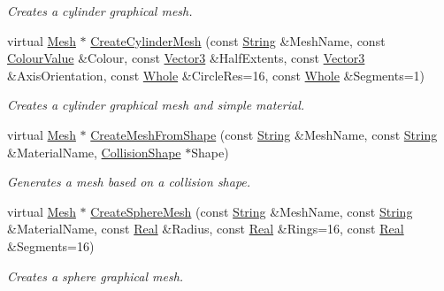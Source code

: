 \begin{DoxyCompactItemize}
\begin{DoxyCompactList}\small\item\em Creates a cylinder graphical mesh. \item\end{DoxyCompactList}\item 
virtual \hyperlink{classphys_1_1Mesh}{Mesh} $\ast$ \hyperlink{classphys_1_1MeshManager_a3e690963dc53e430dabe4ac9915ef170}{CreateCylinderMesh} (const \hyperlink{namespacephys_aa03900411993de7fbfec4789bc1d392e}{String} \&MeshName, const \hyperlink{classphys_1_1ColourValue}{ColourValue} \&Colour, const \hyperlink{classphys_1_1Vector3}{Vector3} \&HalfExtents, const \hyperlink{classphys_1_1Vector3}{Vector3} \&AxisOrientation, const \hyperlink{namespacephys_a460f6bc24c8dd347b05e0366ae34f34a}{Whole} \&CircleRes=16, const \hyperlink{namespacephys_a460f6bc24c8dd347b05e0366ae34f34a}{Whole} \&Segments=1)
\begin{DoxyCompactList}\small\item\em Creates a cylinder graphical mesh and simple material. \item\end{DoxyCompactList}\item 
virtual \hyperlink{classphys_1_1Mesh}{Mesh} $\ast$ \hyperlink{classphys_1_1MeshManager_a103d2b3cbead1341c3a45f138a68db45}{CreateMeshFromShape} (const \hyperlink{namespacephys_aa03900411993de7fbfec4789bc1d392e}{String} \&MeshName, const \hyperlink{namespacephys_aa03900411993de7fbfec4789bc1d392e}{String} \&MaterialName, \hyperlink{classphys_1_1CollisionShape}{CollisionShape} $\ast$Shape)
\begin{DoxyCompactList}\small\item\em Generates a mesh based on a collision shape. \item\end{DoxyCompactList}\item 
virtual \hyperlink{classphys_1_1Mesh}{Mesh} $\ast$ \hyperlink{classphys_1_1MeshManager_a5b010c8cce3d31c0ddc1094f5afb851f}{CreateSphereMesh} (const \hyperlink{namespacephys_aa03900411993de7fbfec4789bc1d392e}{String} \&MeshName, const \hyperlink{namespacephys_aa03900411993de7fbfec4789bc1d392e}{String} \&MaterialName, const \hyperlink{namespacephys_af7eb897198d265b8e868f45240230d5f}{Real} \&Radius, const \hyperlink{namespacephys_af7eb897198d265b8e868f45240230d5f}{Real} \&Rings=16, const \hyperlink{namespacephys_af7eb897198d265b8e868f45240230d5f}{Real} \&Segments=16)
\begin{DoxyCompactList}\small\item\em Creates a sphere graphical mesh. \item\end{DoxyCompactList}\item 

\end{DoxyCompactItemize}

